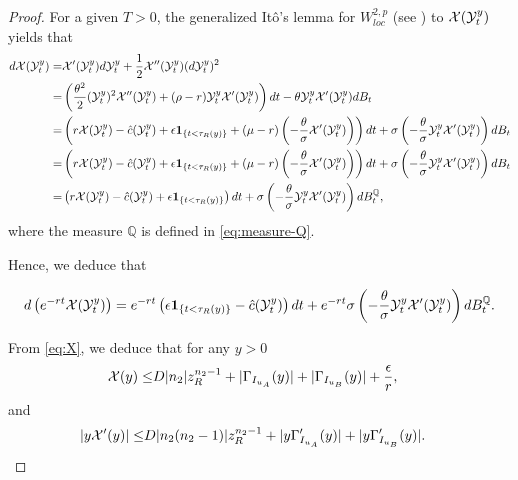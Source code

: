\documentclass[a4paper,report, 11pt]{article}
\def\e{\epsilon}
\def\m{\mu}
\def\s{\sigma}
\def\t{\theta}
\begin{document}
\begin{proof}
	
	For a given $T>0$, the generalized It\^{o}'s lemma for $W_{loc}^{2,p}$ (see \citet{Krylov}) to ${\cal X}({\cal Y}_t^{y})$ yields that 
	\begin{eqnarray}
	\begin{split}\label{eq:dynamics:X1}
	d{\cal X}({\cal Y}_t^{y})=&{\cal X}'({\cal Y}_t^{y})d{\cal Y}_t^{y} +\dfrac{1}{2}{\cal X}''({\cal Y}_t^{y})(d{\cal Y}_t^{y})^2\\
	=&\left(\dfrac{\t^2}{2}({\cal Y}_t^{y})^2{\cal X}''({\cal Y}_t^{y})+(\rho-r){\cal Y}_t^{y} {\cal X}'({\cal Y}_t^{y})\right)dt-\t {\cal Y}_t^{y} {\cal X}'({\cal Y}_t^{y})dB_t\\
	=&\left( r{\cal X}({\cal Y}_t^{y})-\hat{c}({\cal Y}_t^{y})+\e{\bf 1}_{\{t<\tau_R(y)\}}+(\m-r)\left(-\frac{\t}{\s}{\cal X}'({\cal Y}_t^{y})\right) \right)dt+\s \left(-\frac{\t}{\s}{\cal Y}_t^{y}{\cal X}'({\cal Y}_t^{y})\right) dB_t\\
	=&\left( r{\cal X}({\cal Y}_t^{y})-\hat{c}({\cal Y}_t^{y})+ \e{\bf 1}_{\{t<\tau_R(y)\}}+(\m-r)\left(-\frac{\t}{\s}{\cal X}'({\cal Y}_t^{y})\right) \right)dt+\s \left(-\frac{\t}{\s}{\cal Y}_t^{y}{\cal X}'({\cal Y}_t^{y})\right) dB_t\\
	=&\left( r{\cal X}({\cal Y}_t^{y})-\hat{c}({\cal Y}_t^{y})+ \e{\bf 1}_{\{t<\tau_R(y)\}}\right)dt+\s \left(-\frac{\t}{\s}{\cal Y}_t^{y}{\cal X}'({\cal Y}_t^{y})\right) dB_t^\mathbb{Q},
	\end{split}
	\end{eqnarray}
	where the measure $\mathbb{Q}$ is defined in \eqref{eq:measure-Q}.
	
	Hence, we deduce that 
	\begin{footnotesize}
		\begin{eqnarray}
		\begin{split}\label{eq:dynamics:X2}
		d\left(e^{-rt}{\cal X}({\cal Y}_t^{y})\right)=e^{-rt}\left(\e{\bf 1}_{\{t<\tau_R(y)\}}-\hat{c}({\cal Y}_t^{y})\right)dt+e^{-rt}\s \left(-\frac{\t}{\s}{\cal Y}_t^y{\cal X}'({\cal Y}_t^{y})\right) dB_t^\mathbb{Q}.
		\end{split}
		\end{eqnarray}
	\end{footnotesize}
	
	From \eqref{eq:X}, we deduce that for any $y>0$ 
	\begin{align*}
	{\cal X}(y)\le& D|n_2| z_R^{n_2-1}+|\Gamma_{I_{u_A}}(y)| + |\Gamma_{I_{u_B}}(y)|+\dfrac{\e}{r},
	\end{align*}
	and
	\begin{align*}
	|y{\cal X}'(y)|\le& D|n_2(n_2-1)| z_R^{n_2-1}+|y\Gamma_{I_{u_A}}'(y)| + |y\Gamma_{I_{u_B}}'(y)|.
	\end{align*}
	

\end{proof}
\end{document}

